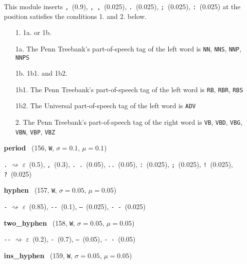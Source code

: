 \documentclass[11pt]{article}
\newenvironment{desc}{%
	\list{}{%
		\parsep 0.25em
		\topsep 0.25em
		\leftmargin 1em
		\rightmargin 0em
	}
	\item\relax
	\sloppy
}{%
	\endlist
}
\newcommand{\attr}[4]{%
	(#1, \texttt{#2}, $\sigma=#3$, $\mu=#4$)
}
\begin{document}
\begin{desc}
	This module inserts
	\texttt{,}~(0.9),
	\texttt{,{~},}~(0.025),
	\texttt{.}~(0.025),
	\texttt{;}~(0.025),
	\texttt{:}~(0.025)
	at the position satisfies the conditions 1. and 2. below.

	\begin{itemize}
		\setlength{\itemsep}{0em}
		\setlength{\parskip}{0em}
		\item[1.] 1a. or 1b.
		\item[1a.] The Penn Treebank's part-of-speech tag of the left word is
			\texttt{NN},
			\texttt{NNS},
			\texttt{NNP},
			\texttt{NNPS}
		\item[1b.] 1b1. and 1b2.
		\item[1b1.] The Penn Treebank's part-of-speech tag of the left word is
			\texttt{RB},
			\texttt{RBR},
			\texttt{RBS}
		\item[1b2.] The Universal part-of-speech tag of the left word is \texttt{ADV}
		\item[2.] The Penn Treebank's part-of-speech tag of the right word is
			\texttt{VB},
			\texttt{VBD},
			\texttt{VBG},
			\texttt{VBN},
			\texttt{VBP},
			\texttt{VBZ}
	\end{itemize}
\end{desc}

\noindent
\textbf{period}~\attr{156}{W}{0.1}{0.1}

\begin{desc}
	\texttt{.}
	$\rightsquigarrow$
	\textit{$\varepsilon$}~(0.5),
	\texttt{,}~(0.3),
	\texttt{.{~}.}~(0.05),
	\texttt{..}~(0.05),
	\texttt{:}~(0.025),
	\texttt{;}~(0.025),
	\texttt{!}~(0.025),
	\texttt{?}~(0.025)
\end{desc}

\noindent
\textbf{hyphen}~\attr{157}{W}{0.05}{0.05}

\begin{desc}
	\texttt{-}
	$\rightsquigarrow$
	\textit{$\varepsilon$}~(0.85),
	\texttt{-{}-}~(0.1),
	\texttt{---}~(0.025),
	\texttt{-~-}~(0.025)
\end{desc}

\noindent
\textbf{two\_hyphen}~\attr{158}{W}{0.05}{0.05}

\begin{desc}
	\texttt{-{}-}
	$\rightsquigarrow$
	\textit{$\varepsilon$}~(0.2),
	\texttt{-}~(0.7),
	\texttt{---}~(0.05),
	\texttt{-~-}~(0.05)
\end{desc}

\noindent
\textbf{ins\_hyphen}~\attr{159}{W}{0.05}{0.05}
\end{document}
